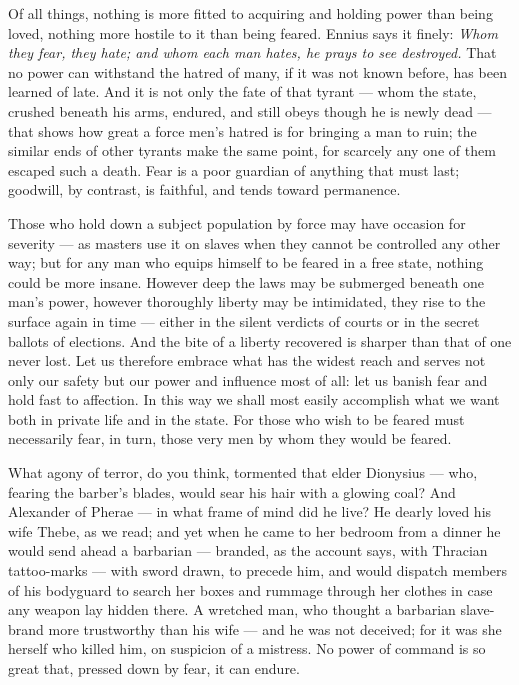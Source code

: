  Of all things, nothing is more fitted to acquiring and holding power than being loved, nothing more hostile to it than being feared. Ennius says it finely: \textit{Whom they fear, they hate; and whom each man hates, he prays to see destroyed.} That no power can withstand the hatred of many, if it was not known before, has been learned of late. And it is not only the fate of that tyrant — whom the state, crushed beneath his arms, endured, and still obeys though he is newly dead — that shows how great a force men's hatred is for bringing a man to ruin; the similar ends of other tyrants make the same point, for scarcely any one of them escaped such a death. Fear is a poor guardian of anything that must last; goodwill, by contrast, is faithful, and tends toward permanence.

 Those who hold down a subject population by force may have occasion for severity — as masters use it on slaves when they cannot be controlled any other way; but for any man who equips himself to be feared in a free state, nothing could be more insane. However deep the laws may be submerged beneath one man's power, however thoroughly liberty may be intimidated, they rise to the surface again in time — either in the silent verdicts of courts or in the secret ballots of elections. And the bite of a liberty recovered is sharper than that of one never lost. Let us therefore embrace what has the widest reach and serves not only our safety but our power and influence most of all: let us banish fear and hold fast to affection. In this way we shall most easily accomplish what we want both in private life and in the state. For those who wish to be feared must necessarily fear, in turn, those very men by whom they would be feared.

 What agony of terror, do you think, tormented that elder Dionysius — who, fearing the barber's blades, would sear his hair with a glowing coal? And Alexander of Pherae — in what frame of mind did he live? He dearly loved his wife Thebe, as we read; and yet when he came to her bedroom from a dinner he would send ahead a barbarian — branded, as the account says, with Thracian tattoo-marks — with sword drawn, to precede him, and would dispatch members of his bodyguard to search her boxes and rummage through her clothes in case any weapon lay hidden there. A wretched man, who thought a barbarian slave-brand more trustworthy than his wife — and he was not deceived; for it was she herself who killed him, on suspicion of a mistress. No power of command is so great that, pressed down by fear, it can endure.

